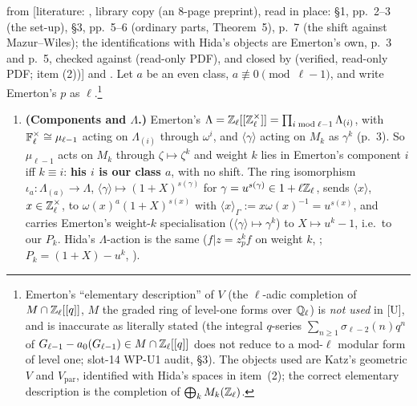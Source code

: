 \documentclass[11pt]{article}
\newcommand{\LIT}[1]{\textsf{[literature: #1]}}   %
\newcommand{\Iw}{\Lambda}                         %
\newcommand{\Pk}[1]{P_{#1}}                       %
\newcommand{\Zl}{\Z_\ell}
\newcommand{\Ql}{\Q_\ell}
\begin{document}
\begin{lemma}\label{lem:u-emerton}
\PROVED{} from \LIT{\cite{emerton_eis}, library copy (an $8$-page preprint), read in place: \S1, pp.~2--3 (the set-up), \S3, pp.~5--6
(ordinary parts, Theorem~5), p.~7 (the shift against Mazur--Wiles); the identifications with Hida's objects are Emerton's own, p.~3 and p.~5,
checked against \cite[(1.12), (1.14)--(1.19), \S3 pp.~249--250]{hida_ens} (read-only PDF), and closed by \cite[(1.2), p.~9; (1.3), p.~10; Thm.~1.3,
p.~17; Thm.~2.2, p.~20]{hida_aif2} (verified, read-only PDF; item (2))} and .
Let $a$ be an even class, $a\not\equiv0\pmod{\ell-1}$, and write Emerton's $p$ as $\ell$.\footnote{Emerton's ``elementary description'' of $V$
\cite[p.~2]{emerton_eis} (the $\ell$-adic completion of $M\cap\Zl[[q]]$, $M$ the graded ring of level-one forms over $\Ql$) is \emph{not used} in [U], and is
inaccurate as literally stated (the integral $q$-series $\sum_{n\ge1}\sigma_{\ell-2}(n)q^{n}$ of $G_{\ell-1}-a_0(G_{\ell-1})\in M\cap\Zl[[q]]$ does not reduce to a
mod-$\ell$ modular form of level one; slot-14 WP-U1 audit, \S3). The objects used are Katz's geometric $V$ and $V_{\mathrm{par}}$, identified with Hida's
spaces in item~(2); the correct elementary description is the completion of $\bigoplus_k M_k(\Zl)$.}
\begin{enumerate}
\item \textbf{(Components and $\Iw$.)} Emerton's $\Iw=\Zl[[\Zl^\times]]=\prod_{i\bmod\ell-1}\Iw_{(i)}$, with $\mathbb{F}_\ell^\times\cong\mu_{\ell-1}$ acting on
  $\Iw_{(i)}$ through $\omega^{i}$, and $\langle\gamma\rangle$ acting on $M_k$ as $\gamma^{k}$ (p.~3). So $\mu_{\ell-1}$ acts on $M_k$ through
  $\zeta\mapsto\zeta^{k}$ and weight $k$ lies in Emerton's component $i$ iff $k\equiv i$: \textbf{his $i$ is our class $a$}, with no shift. The ring
  isomorphism $\iota_a\colon\Iw_{(a)}\to\Iw$, $\langle\gamma\rangle\mapsto(1+X)^{s(\gamma)}$ for $\gamma=u^{s(\gamma)}\in1+\ell\Zl$, sends
  $\langle x\rangle$, $x\in\Zl^\times$, to $\omega(x)^{a}(1+X)^{s(x)}$ with $\langle x\rangle_\Gamma:=x\omega(x)^{-1}=u^{s(x)}$, and carries Emerton's
  weight-$k$ specialisation ($\langle\gamma\rangle\mapsto\gamma^{k}$) to $X\mapsto u^{k}-1$, i.e.\ to our $\Pk{k}$. Hida's $\Iw$-action is the same
  ($f|z=z_p^{k}f$ on weight $k$, \cite[(1.12)]{hida_ens}; $P_k=(1+X)-u^{k}$, \cite[p.~250]{hida_ens}).

\end{enumerate}
\end{lemma}
\end{document}
